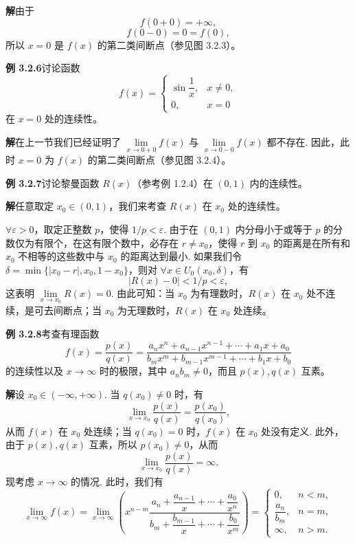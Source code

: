 \documentclass[UTF8, 12pt, fontset=fandol, oneside]{ctexart}
\begin{document}
\noindent\textbf{解}\quad 由于
\[
  f(0+0)=+\infty,
\]
\[
  f(0-0)=0=f(0),
\]
所以 $x=0$ 是 $f(x)$ 的第二类间断点（参见图 3.2.3）。

\noindent\textbf{例 3.2.6}\quad 讨论函数
\[
  f(x)=
  \begin{cases}
    \sin\dfrac1x, & x\ne0,\\
    0, & x=0
  \end{cases}
\]
在 $x=0$ 处的连续性。

\noindent\textbf{解}\quad 在上一节我们已经证明了 $\lim\limits_{x\to0+0}f(x)$ 与 $\lim\limits_{x\to0-0}f(x)$ 都不存在. 因此，此时 $x=0$ 为 $f(x)$ 的第二类间断点（参见图 3.2.4）。

\noindent\textbf{例 3.2.7}\quad 讨论黎曼函数 $R(x)$（参考例 1.2.4）在 $(0,1)$ 内的连续性。

\noindent\textbf{解}\quad 任意取定 $x_0\in(0,1)$，我们来考查 $R(x)$ 在 $x_0$ 处的连续性。

$\forall\varepsilon>0$，取定正整数 $p$，使得 $1/p<\varepsilon$. 由于在 $(0,1)$ 内分母小于或等于 $p$ 的分数仅为有限个，在这有限个数中，必存在 $r\ne x_0$，使得 $r$ 到 $x_0$ 的距离是在所有和 $x_0$ 不相等的这些数中与 $x_0$ 的距离达到最小. 如果我们令 $\delta=\min\{|x_0-r|,x_0,1-x_0\}$，则对 $\forall x\in U_0(x_0,\delta)$，有
\[
  |R(x)-0|<1/p<\varepsilon,
\]
这表明 $\lim\limits_{x\to x_0}R(x)=0$. 由此可知：当 $x_0$ 为有理数时，$R(x)$ 在 $x_0$ 处不连续，是可去间断点；当 $x_0$ 为无理数时，$R(x)$ 在 $x_0$ 处连续。

\noindent\textbf{例 3.2.8}\quad 考查有理函数
\[
  f(x)=\frac{p(x)}{q(x)}
  =
  \frac{a_nx^n+a_{n-1}x^{n-1}+\cdots+a_1x+a_0}
       {b_mx^m+b_{m-1}x^{m-1}+\cdots+b_1x+b_0}
\]
的连续性以及 $x\to\infty$ 时的极限，其中 $a_nb_m\ne0$，而且 $p(x),q(x)$ 互素。

\noindent\textbf{解}\quad 设 $x_0\in(-\infty,+\infty)$. 当 $q(x_0)\ne0$ 时，有
\[
  \lim_{x\to x_0}\frac{p(x)}{q(x)}=\frac{p(x_0)}{q(x_0)},
\]
从而 $f(x)$ 在 $x_0$ 处连续；当 $q(x_0)=0$ 时，$f(x)$ 在 $x_0$ 处没有定义. 此外，由于 $p(x),q(x)$ 互素，所以 $p(x_0)\ne0$，从而
\[
  \lim_{x\to x_0}\frac{p(x)}{q(x)}=\infty.
\]
现考虑 $x\to\infty$ 的情况. 此时，我们有
\[
  \lim_{x\to\infty}f(x)
  =
  \lim_{x\to\infty}
  \left(
    x^{n-m}\frac{a_n+\dfrac{a_{n-1}}x+\cdots+\dfrac{a_0}{x^n}}
    {b_m+\dfrac{b_{m-1}}x+\cdots+\dfrac{b_0}{x^m}}
  \right)
  =
  \begin{cases}
    0, & n<m,\\[4pt]
    \dfrac{a_n}{b_m}, & n=m,\\[6pt]
    \infty, & n>m.
  \end{cases}
\]
\end{document}
